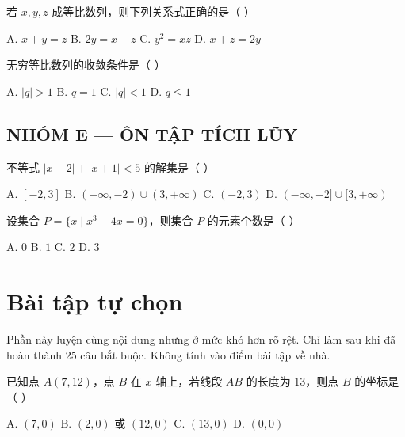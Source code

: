 \documentclass[11pt, a4paper]{article}
\begin{document}
\begin{baitap}[22]
若 $x, y, z$ 成等比数列，则下列关系式正确的是（ ）
\par\vspace{3pt}
\noindent A. $x + y = z$ \quad B. $2y = x + z$ \quad C. $y^2 = xz$ \quad D. $x + z = 2y$
\end{baitap}

\begin{baitap}[23]
无穷等比数列的收敛条件是（ ）
\par\vspace{3pt}
\noindent A. $|q| > 1$ \quad B. $q = 1$ \quad C. $|q| < 1$ \quad D. $q \le 1$
\end{baitap}

\subsection*{NHÓM E — ÔN TẬP TÍCH LŨY}

\begin{baitap}[24]
不等式 $|x - 2| + |x + 1| < 5$ 的解集是（ ）
\par\vspace{3pt}
\noindent A. $[-2,3]$ \quad B. $(-\infty, -2) \cup (3, +\infty)$ \quad C. $(-2,3)$ \quad D. $(-\infty, -2] \cup [3, +\infty)$
\end{baitap}

\begin{baitap}[25]
设集合 $P = \{x \mid x^3 - 4x = 0\}$，则集合 $P$ 的元素个数是（ ）
\par\vspace{3pt}
\noindent A. $0$ \quad B. $1$ \quad C. $2$ \quad D. $3$
\end{baitap}

\clearpage
\section{Bài tập tự chọn}

Phần này luyện cùng nội dung nhưng ở mức khó hơn rõ rệt. Chỉ làm sau khi đã hoàn thành 25 câu bắt buộc. Không tính vào điểm bài tập về nhà.

\begin{baitap}[1]
已知点 $A(7,12)$，点 $B$ 在 $x$ 轴上，若线段 $AB$ 的长度为 $13$，则点 $B$ 的坐标是（ ）
\par\vspace{3pt}
\noindent A. $(7,0)$ \quad B. $(2,0)$ 或 $(12,0)$ \quad C. $(13,0)$ \quad D. $(0,0)$
\end{baitap}
\end{document}
